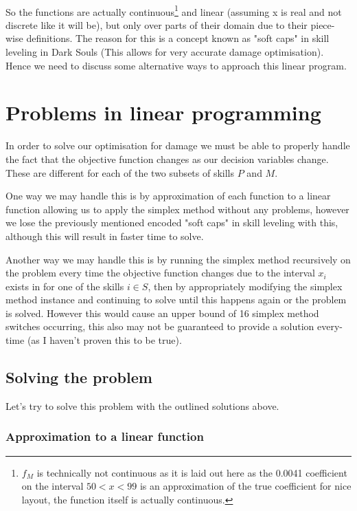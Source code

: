 \documentclass{article}
\begin{document}
\paragraph{}So the functions are actually continuous\footnote{$f_M$ is technically not continuous as it is laid out here as the 0.0041 coefficient on the interval $50 < x < 99$ is an approximation of the true coefficient for nice layout, the function itself is actually continuous.} and linear (assuming x is real and not discrete like it will be), but only over parts of their domain due to their piece-wise definitions. The reason for this is a concept known as "soft caps" in skill leveling in Dark Souls (This allows for very accurate damage optimisation). Hence we need to discuss some alternative ways to approach this linear program.
\section{Problems in linear programming}
\par In order to solve our optimisation for damage we must be able to properly handle the fact that the objective function changes as our decision variables change. These are different for each of the two subsets of skills $P$ and $M$.
\par One way we may handle this is by approximation of each function to a linear function allowing us to apply the simplex method without any problems, however we lose the previously mentioned encoded "soft caps" in skill leveling with this, although this will result in faster time to solve.
\par Another way we may handle this is by running the simplex method recursively on the problem every time the objective function changes due to the interval $x_i$ exists in for one of the skills $i \in S$, then by appropriately modifying the simplex method instance and continuing to solve until this happens again or the problem is solved. However this would cause an upper bound of 16 simplex method switches occurring, this also may not be guaranteed to provide a solution every-time (as I haven't proven this to be true).
\subsection{Solving the problem}
\par Let's try to solve this problem with the outlined solutions above.
\subsubsection{Approximation to a linear function}
\end{document}
